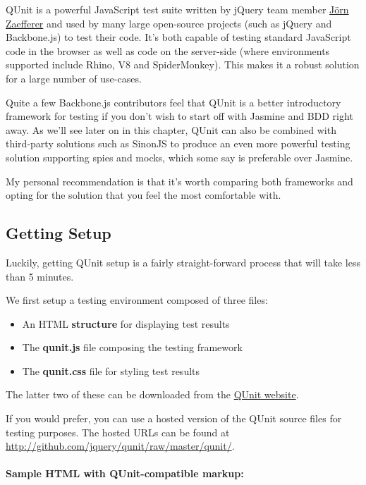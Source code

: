 \documentclass[9pt]{book}
\begin{document}
QUnit is a powerful JavaScript test suite written by jQuery team member
\href{http://bassistance.de/}{Jörn Zaefferer} and used by many large
open-source projects (such as jQuery and Backbone.js) to test their
code. It's both capable of testing standard JavaScript code in the
browser as well as code on the server-side (where environments supported
include Rhino, V8 and SpiderMonkey). This makes it a robust solution for
a large number of use-cases.

Quite a few Backbone.js contributors feel that QUnit is a better
introductory framework for testing if you don't wish to start off with
Jasmine and BDD right away. As we'll see later on in this chapter, QUnit
can also be combined with third-party solutions such as SinonJS to
produce an even more powerful testing solution supporting spies and
mocks, which some say is preferable over Jasmine.

My personal recommendation is that it's worth comparing both frameworks
and opting for the solution that you feel the most comfortable with.

\subsection{Getting Setup}\label{getting-setup}

Luckily, getting QUnit setup is a fairly straight-forward process that
will take less than 5 minutes.

We first setup a testing environment composed of three files:

\begin{itemize}
\itemsep1pt\parskip0pt
\item
  An HTML \textbf{structure} for displaying test results
\item
  The \textbf{qunit.js} file composing the testing framework
\item
  The \textbf{qunit.css} file for styling test results
\end{itemize}

The latter two of these can be downloaded from the
\href{http://qunitjs.com}{QUnit website}.

If you would prefer, you can use a hosted version of the QUnit source
files for testing purposes. The hosted URLs can be found at
\url{http://github.com/jquery/qunit/raw/master/qunit/}.

\paragraph{Sample HTML with QUnit-compatible
markup:}\label{sample-html-with-qunit-compatible-markup}
\end{document}
